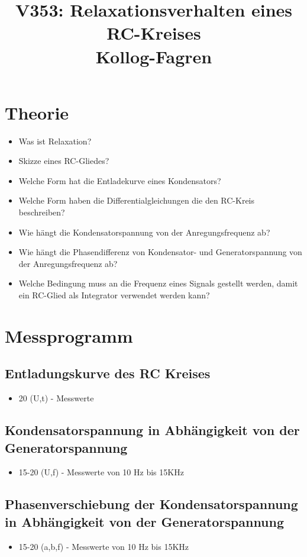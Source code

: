 \documentclass[11pt,a4paper]{article}
\title{\textbf{V353: Relaxationsverhalten eines RC-Kreises}\\Kollog-Fagren}
\date{}
\begin{document}
\maketitle

\section{Theorie}
\begin{itemize}
\item Was ist Relaxation?
\item Skizze eines RC-Gliedes?
\item Welche Form hat die Entladekurve eines Kondensators?
\item Welche Form haben die Differentialgleichungen die den RC-Kreis beschreiben?
\item Wie hängt die Kondensatorspannung von der Anregungsfrequenz ab?
\item Wie hängt die Phasendifferenz von Kondensator- und Generatorspannung von der Anregungsfrequenz ab?
\item Welche Bedingung muss an die Frequenz eines Signals gestellt werden, damit ein RC-Glied als Integrator verwendet werden kann?
\end{itemize}
\section{Messprogramm}
\subsection{Entladungskurve des RC Kreises}
\begin{itemize}
\item 20 (U,t) - Messwerte
\end{itemize}

\subsection{Kondensatorspannung in Abhängigkeit von der Generatorspannung}
\begin{itemize}
\item 15-20 (U,f) - Messwerte von 10 Hz bis 15KHz
\end{itemize}
\subsection{Phasenverschiebung der Kondensatorspannung in Abhängigkeit von der Generatorspannung}
\begin{itemize}
\item 15-20 (a,b,f) - Messwerte von 10 Hz bis 15KHz
\end{itemize}
\end{document}
